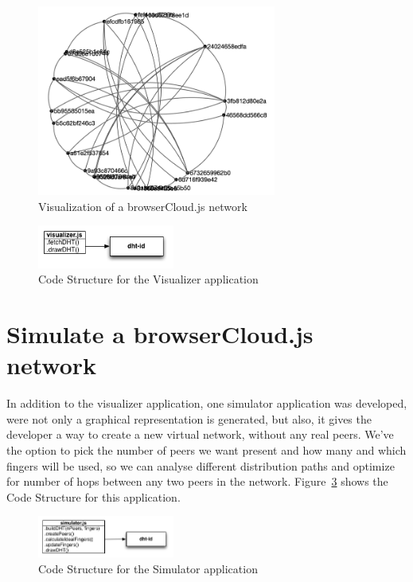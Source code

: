 \begin{figure}[h!]
  \centering
  \includegraphics[width=0.7\textwidth]{figs/visualizer}
  \caption{Visualization of a browserCloud.js network}
  \label{fig:visualizer}
\end{figure}

\begin{figure}[h!]
  \centering
  \includegraphics[width=0.4\textwidth]{figs/diagram-visualizer}
  \caption{Code Structure for the Visualizer application}
  \label{fig:d-v}
\end{figure}

\section{Simulate a browserCloud.js network}

In addition to the visualizer application, one simulator application was developed, were not only a graphical representation is generated, but also, it gives the developer a way to create a new virtual network, without any real peers. We've the option to pick the number of peers we want present and how many and which fingers will be used, so we can analyse different distribution paths and optimize for number of hops between any two peers in the network. Figure~\ref{fig:d-s} shows the Code Structure for this application.


\begin{figure}[h!]
  \centering
  \includegraphics[width=0.4\textwidth]{figs/diagram-simulator}
  \caption{Code Structure for the Simulator application}
  \label{fig:d-s}
\end{figure}

